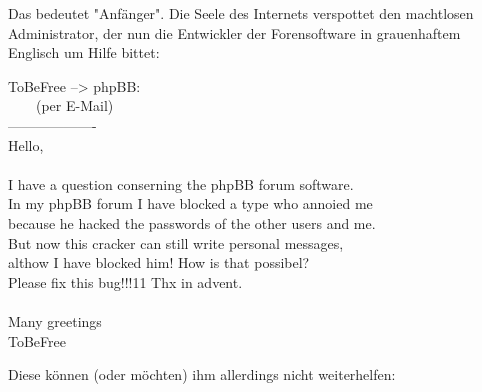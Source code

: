 Das bedeutet "Anfänger". Die Seele des Internets verspottet den machtlosen Administrator, der nun die Entwickler der Forensoftware in grauenhaftem Englisch um Hilfe bittet:

\noindent \parbox{\textwidth}{

    \begin{footnotesize}
    \begin{itshape}
    \begin{flushright}

\noindent ToBeFree --> phpBB:\\
\noindent ~~~~(per E-Mail)\\
\noindent -------------------\\
\noindent Hello,\\
\noindent ~\\
\noindent I have a question conserning the phpBB forum software.\\
\noindent In my phpBB forum I have blocked a type who annoied me\\
\noindent because he hacked the passwords of the other users and me.\\
\noindent But now this cracker can still write personal messages,\\
\noindent althow I have blocked him! How is that possibel?\\
\noindent Please fix this bug!!!11 Thx in advent.\\
\noindent ~\\
\noindent Many greetings\\
\noindent ToBeFree\\

    \end{flushright}
    \end{itshape}
    \end{footnotesize}

}

Diese können (oder möchten) ihm allerdings nicht weiterhelfen:

